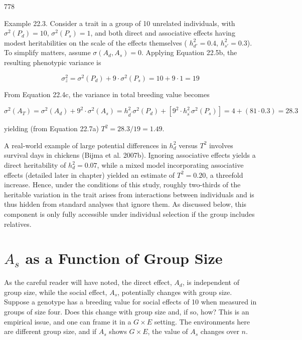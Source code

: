 \documentclass{article}
\begin{document}
778

Example 22.3. Consider a trait in a group of 10 unrelated individuals, with  $ \sigma^2(P_d) = 10 $,  $ \sigma^2(P_s) = 1 $, and both direct and associative effects having modest heritabilities on the scale of the effects themselves ( $ h_{d'}^2 = 0.4 $,  $ h_{s'}^2 = 0.3 $). To simplify matters, assume  $ \sigma(A_d, A_s) = 0 $. Applying Equation 22.5b, the resulting phenotypic variance is

\begin{equation}
\sigma_{z}^{2}=\sigma^{2}(P_{d})+9\cdot\sigma^{2}(P_{s})=10+9\cdot1=19
\end{equation}

From Equation 22.4c, the variance in total breeding value becomes

\begin{equation}
\sigma^{2}(A_{T})=\sigma^{2}(A_{d})+9^{2}\cdot\sigma^{2}(A_{s})=h_{d^{\prime}}^{2}\sigma^{2}(P_{d})+\left[9^{2}\cdot h_{s^{\prime}}^{2}\sigma^{2}(P_{s})\right]=4+(81\cdot0.3)=28.3
\end{equation}

yielding (from Equation 22.7a)  $ T^{2}=28.3/19=1.49 $.

A real-world example of large potential differences in  $ h_d^2 $ versus  $ T^2 $ involves survival days in chickens (Bijma et al. 2007b). Ignoring associative effects yields a direct heritability of  $ h_d^2 = 0.07 $, while a mixed model incorporating associative effects (detailed later in chapter) yielded an estimate of  $ T^2 = 0.20 $, a threefold increase. Hence, under the conditions of this study, roughly two-thirds of the heritable variation in the trait arises from interactions between individuals and is thus hidden from standard analyses that ignore them. As discussed below, this component is only fully accessible under individual selection if the group includes relatives.

\section{ $ A_{s} $ as a Function of Group Size}
As the careful reader will have noted, the direct effect,  $ A_d $, is independent of group size, while the social effect,  $ A_s $, potentially changes with group size. Suppose a genotype has a breeding value for social effects of 10 when measured in groups of size four. Does this change with group size and, if so, how? This is an empirical issue, and one can frame it in a  $ G \times E $ setting. The environments here are different group size, and if  $ A_s $ shows  $ G \times E $, the value of  $ A_s $ changes over  $ n $.
\end{document}
